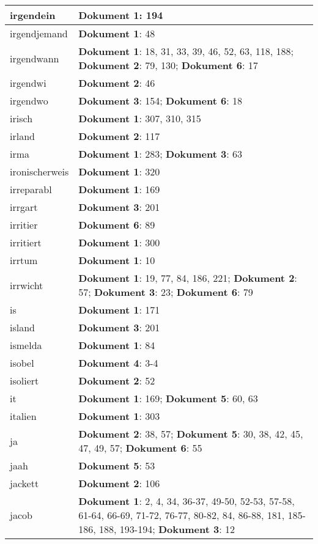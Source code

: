 \documentclass[a5paper]{article}
\begin{document}
\begin{longtable}[l]{|l|p{3in}|}
\hline
irgendein & \textbf{Dokument 1}: 194 \\
\hline
irgendjemand & \textbf{Dokument 1}: 48 \\
\hline
irgendwann & \textbf{Dokument 1}: 18, 31, 33, 39, 46, 52, 63, 118, 188; \textbf{Dokument 2}: 79, 130; \textbf{Dokument 6}: 17 \\
\hline
irgendwi & \textbf{Dokument 2}: 46 \\
\hline
irgendwo & \textbf{Dokument 3}: 154; \textbf{Dokument 6}: 18 \\
\hline
irisch & \textbf{Dokument 1}: 307, 310, 315 \\
\hline
irland & \textbf{Dokument 2}: 117 \\
\hline
irma & \textbf{Dokument 1}: 283; \textbf{Dokument 3}: 63 \\
\hline
ironischerweis & \textbf{Dokument 1}: 320 \\
\hline
irreparabl & \textbf{Dokument 1}: 169 \\
\hline
irrgart & \textbf{Dokument 3}: 201 \\
\hline
irritier & \textbf{Dokument 6}: 89 \\
\hline
irritiert & \textbf{Dokument 1}: 300 \\
\hline
irrtum & \textbf{Dokument 1}: 10 \\
\hline
irrwicht & \textbf{Dokument 1}: 19, 77, 84, 186, 221; \textbf{Dokument 2}: 57; \textbf{Dokument 3}: 23; \textbf{Dokument 6}: 79 \\
\hline
is & \textbf{Dokument 1}: 171 \\
\hline
island & \textbf{Dokument 3}: 201 \\
\hline
ismelda & \textbf{Dokument 1}: 84 \\
\hline
isobel & \textbf{Dokument 4}: 3-4 \\
\hline
isoliert & \textbf{Dokument 2}: 52 \\
\hline
it & \textbf{Dokument 1}: 169; \textbf{Dokument 5}: 60, 63 \\
\hline
italien & \textbf{Dokument 1}: 303 \\
\hline
ja & \textbf{Dokument 2}: 38, 57; \textbf{Dokument 5}: 30, 38, 42, 45, 47, 49, 57; \textbf{Dokument 6}: 55 \\
\hline
jaah & \textbf{Dokument 5}: 53 \\
\hline
jackett & \textbf{Dokument 2}: 106 \\
\hline
jacob & \textbf{Dokument 1}: 2, 4, 34, 36-37, 49-50, 52-53, 57-58, 61-64, 66-69, 71-72, 76-77, 80-82, 84, 86-88, 181, 185-186, 188, 193-194; \textbf{Dokument 3}: 12 \\

\end{longtable}
\end{document}
